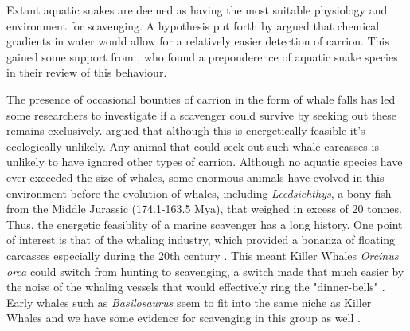 \documentclass[a4paper,12pt]{article}
\begin{document}
Extant aquatic snakes are deemed as having the most suitable physiology and environment for scavenging. A hypothesis put forth by \cite{sazima1990necrofagia} argued that chemical gradients in water would allow for a relatively easier detection of carrion. This gained some support from \cite{devault2002scavenging}, who found a preponderence of aquatic snake species in their review of this behaviour. 

The presence of occasional bounties of carrion in the form of whale falls has led some researchers to investigate if a scavenger could survive by seeking out these remains exclusively. \cite{ruxton2005searching} argued that although this is energetically feasible it's ecologically unlikely. Any animal that could seek out such whale carcasses is unlikely to have ignored other types of carrion. Although no aquatic species have ever exceeded the size of whales, some enormous animals have evolved in this environment before the evolution of whales, including \textit{Leedsichthys}, a bony fish from the Middle Jurassic (174.1-163.5 Mya), that weighed in excess of 20 tonnes. Thus, the energetic feasiblity of a marine scavenger has a long history. One point of interest is that of the whaling industry, which provided a bonanza of floating carcasses especially during the 20th century \citep{Whitehead415}. This meant Killer Whales \textit{Orcinus orca} could switch from hunting to scavenging, a switch made that much easier by the noise of the whaling vessels that would effectively ring the "dinner-bells" \citep{Whitehead415}. Early whales such as \textit{Basilosaurus} seem to fit into the same niche as Killer Whales and we have some evidence for scavenging in this group as well \citep{fahlke2012bite}. 
\end{document}
